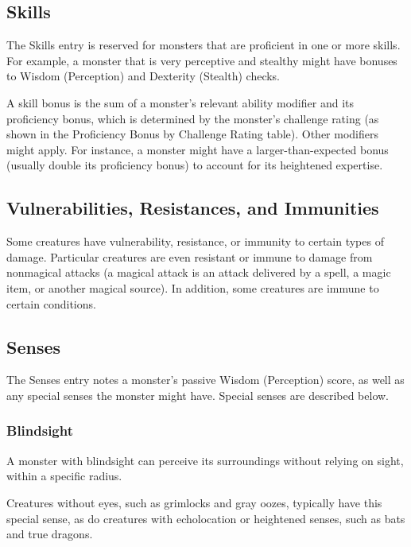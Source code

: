 \documentclass[
]{article}
\begin{document}
\hypertarget{skills}{%
\subsection{Skills}\label{skills}}

The Skills entry is reserved for monsters that are proficient in one or
more skills. For example, a monster that is very perceptive and stealthy
might have bonuses to Wisdom (Perception) and Dexterity (Stealth)
checks.

A skill bonus is the sum of a monster's relevant ability modifier and
its proficiency bonus, which is determined by the monster's challenge
rating (as shown in the Proficiency Bonus by Challenge Rating table).
Other modifiers might apply. For instance, a monster might have a
larger-than-expected bonus (usually double its proficiency bonus) to
account for its heightened expertise.

\hypertarget{vulnerabilities-resistances-and-immunities}{%
\subsection{Vulnerabilities, Resistances, and
Immunities}\label{vulnerabilities-resistances-and-immunities}}

Some creatures have vulnerability, resistance, or immunity to certain
types of damage. Particular creatures are even resistant or immune to
damage from nonmagical attacks (a magical attack is an attack delivered
by a spell, a magic item, or another magical source). In addition, some
creatures are immune to certain conditions.

\hypertarget{senses}{%
\subsection{Senses}\label{senses}}

The Senses entry notes a monster's passive Wisdom (Perception) score, as
well as any special senses the monster might have. Special senses are
described below.

\hypertarget{blindsight}{%
\subsubsection{Blindsight}\label{blindsight}}

A monster with blindsight can perceive its surroundings without relying
on sight, within a specific radius.

Creatures without eyes, such as grimlocks and gray oozes, typically have
this special sense, as do creatures with echolocation or heightened
senses, such as bats and true dragons.
\end{document}

